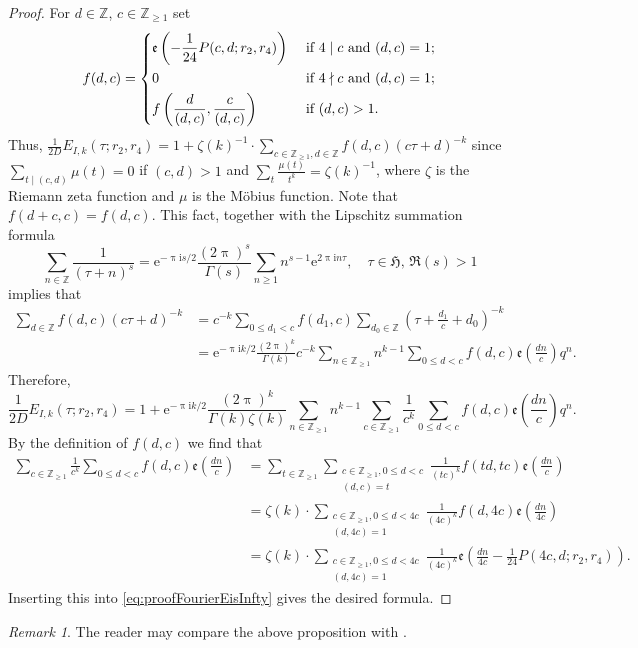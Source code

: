 \documentclass[12pt]{amsart}
\numberwithin{equation}{section}
\theoremstyle{plain}
\theoremstyle{definition}
\theoremstyle{remark}
\newtheorem{rema}[thm]{Remark}
\newcommand\twoscript[2]{\substack{{#1} \\ {#2}}}
\newcommand\rmi{\mathrm{i}}
\newcommand\rme{\mathrm{e}}
\newcommand\etp[1]{\mathfrak{e}\left(#1\right)}
\newcommand\numZ{\mathbb{Z}}
\newcommand\numgeq[2]{\mathbb{#1}_{\geq #2}}
\newcommand\uhp{\mathfrak{H}}
\begin{document}
\begin{proof}
For $d\in\numZ$, $c\in\numgeq{Z}{1}$ set
\begin{equation*}
f(d,c)=\begin{dcases}
\etp{-\frac{1}{24}P(c,d;r_2,r_4)} & \text{ if }4\mid c \text{ and }(d,c)=1;\\
0 & \text{ if }4\nmid c \text{ and }(d,c)=1;\\
f\left(\frac{d}{(d,c)},\frac{c}{(d,c)}\right) &\text{ if } (d,c)>1.
\end{dcases}
\end{equation*}
Thus, $\frac{1}{2D}E_{I,k}(\tau;r_2,r_4)=1+\zeta(k)^{-1}\cdot\sum_{c\in\numgeq{Z}{1},d\in\numZ}f(d,c)(c\tau+d)^{-k}$ since $\sum_{t \mid (c,d)}\mu(t) = 0$ if $(c,d) > 1$ and $\sum_{t}\frac{\mu(t)}{t^k}=\zeta(k)^{-1}$, where $\zeta$ is the Riemann zeta function and $\mu$ is the M\"obius function. Note that $f(d+c,c)=f(d,c)$. This fact, together with the Lipschitz summation formula
\begin{equation*}
\sum_{n \in \numZ}\frac{1}{(\tau+n)^s}=\rme^{-\uppi\rmi s/2}\frac{(2\uppi)^s}{\Gamma(s)}\sum_{n \geq 1}n^{s-1}\rme^{2\uppi\rmi n\tau},\quad \tau\in\uhp,\,\Re(s)>1
\end{equation*}
implies that
\begin{align*}
\sum_{d \in \numZ}f(d,c)(c\tau+d)^{-k} &= c^{-k}\sum_{0 \leq d_1 < c}f(d_1,c)\sum_{d_0 \in \numZ}(\tau+\frac{d_1}{c}+d_0)^{-k} \\
&=\rme^{-\uppi\rmi k/2}\frac{(2\uppi)^k}{\Gamma(k)}c^{-k}\sum_{n \in \numgeq{Z}{1}}n^{k-1}\sum_{0 \leq d < c}f(d,c)\etp{\frac{dn}{c}}q^n.
\end{align*}
Therefore,
\begin{equation}
\label{eq:proofFourierEisInfty}
\frac{1}{2D}E_{I,k}(\tau;r_2,r_4)=1+\rme^{-\uppi\rmi k/2}\frac{(2\uppi)^k}{\Gamma(k)\zeta(k)}\sum_{n \in \numgeq{Z}{1}}n^{k-1}\sum_{c \in \numgeq{Z}{1}}\frac{1}{c^k}\sum_{0 \leq d < c}f(d,c)\etp{\frac{dn}{c}}q^n.
\end{equation}
By the definition of $f(d,c)$ we find that
\begin{align*}
\sum_{c \in \numgeq{Z}{1}}\frac{1}{c^k}\sum_{0 \leq d < c}f(d,c)\etp{\frac{dn}{c}}&=\sum_{t\in\numgeq{Z}{1}}\sum_{\twoscript{c\in\numgeq{Z}{1},0\leq d<c}{(d,c)=t}}\frac{1}{(tc)^k}f(td,tc)\etp{\frac{dn}{c}}\\
&=\zeta(k)\cdot\sum_{\twoscript{c\in\numgeq{Z}{1},0\leq d<4c}{(d,4c)=1}}\frac{1}{(4c)^k}f(d,4c)\etp{\frac{dn}{4c}}\\
&=\zeta(k)\cdot\sum_{\twoscript{c\in\numgeq{Z}{1},0\leq d<4c}{(d,4c)=1}}\frac{1}{(4c)^k}\etp{\frac{dn}{4c}-\frac{1}{24}P(4c,d;r_2,r_4)}.
\end{align*}
Inserting this into \eqref{eq:proofFourierEisInfty} gives the desired formula.
\end{proof}
\begin{rema}
The reader may compare the above proposition with \cite[Theorem 6.2]{Zhu23}.
\end{rema}
\end{document}
